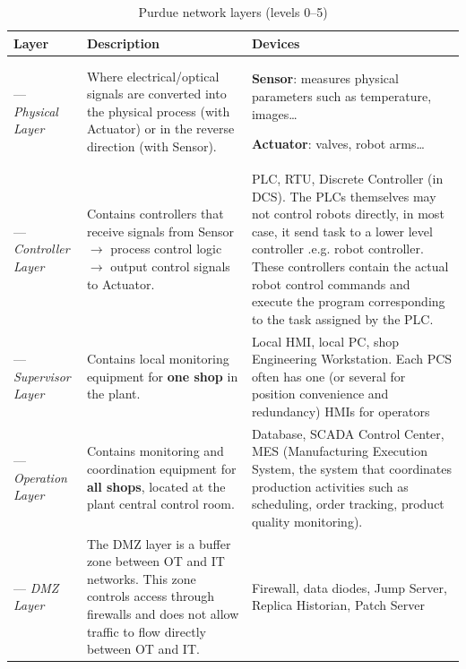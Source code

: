 \documentclass[../main.tex]{subfiles}
\begin{document}
\begin{table}[htbp]
    \centering
    \caption{Purdue network layers (levels 0--5)}
    \label{tab:purdue-layers}
    \footnotesize
    \renewcommand{\arraystretch}{1.25}
    \begin{tabular}{|>{\raggedright\arraybackslash}p{2.1cm}|>{\raggedright\arraybackslash}p{4.3cm}|>{\raggedright\arraybackslash}p{7.2cm}|}
        \hline
        \textbf{Layer} & \textbf{Description} & \textbf{Devices} \\
        \hline
        0 --- \textit{Physical Layer} &
        Where electrical/optical signals are converted into the physical process (with Actuator) or in the reverse direction (with Sensor). &
        \textbf{Sensor}: measures physical parameters such as temperature, images\ldots
        \par\vspace{0.3em}
        \textbf{Actuator}: valves, robot arms\ldots \\
        \hline
        1 --- \textit{Controller Layer} &
        Contains controllers that receive signals from Sensor $\rightarrow$ process control logic $\rightarrow$ output control signals to Actuator. &
        PLC, RTU, Discrete Controller (in DCS). The PLCs themselves may not control robots directly, in most case, it send task to a lower level controller .e.g. robot controller. These controllers contain the actual robot control commands and execute the program corresponding to the task assigned by the PLC. \\
        \hline
        2 --- \textit{Supervisor Layer} &
        Contains local monitoring equipment for \textbf{one shop} in the plant. &
        Local HMI, local PC, shop Engineering Workstation. Each PCS often has one (or several for position convenience and redundancy) HMIs for operators \\
        \hline
        3 --- \textit{Operation Layer} &
        Contains monitoring and coordination equipment for \textbf{all shops}, located at the plant central control room. &
        Database, SCADA Control Center, MES (Manufacturing Execution System, the system that coordinates production activities such as scheduling, order tracking, product quality monitoring). \\
        \hline
        3.5 --- \textit{DMZ Layer} &
        The DMZ layer is a buffer zone between OT and IT networks. This zone controls access through firewalls and does not allow traffic to flow directly between OT and IT. &
        Firewall, data diodes, Jump Server, Replica Historian, Patch Server

\end{tabular}
\end{table}
\end{document}
